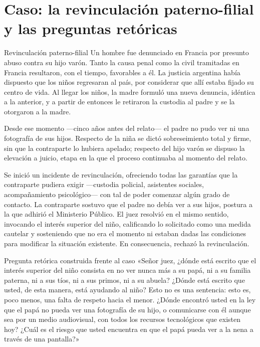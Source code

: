 \documentclass[12pt,oneside]{book}
\begin{document}
\section{Caso: la revinculación paterno-filial y las preguntas retóricas}

\begin{example}{Revinculación paterno-filial}
Un hombre fue denunciado en Francia por presunto abuso contra su hijo varón. Tanto la causa penal como la civil tramitadas en Francia resultaron, con el tiempo, favorables a él. La justicia argentina había dispuesto que los niños regresaran al país, por considerar que allí estaba fijado su centro de vida. Al llegar los niños, la madre formuló una nueva denuncia, idéntica a la anterior, y a partir de entonces le retiraron la custodia al padre y se la otorgaron a la madre.

Desde ese momento —cinco años antes del relato— el padre no pudo ver ni una fotografía de sus hijos. Respecto de la niña se dictó sobreseimiento total y firme, sin que la contraparte lo hubiera apelado; respecto del hijo varón se dispuso la elevación a juicio, etapa en la que el proceso continuaba al momento del relato.
\end{example}

Se inició un incidente de revinculación, ofreciendo todas las garantías que la contraparte pudiera exigir —custodia policial, asistentes sociales, acompañamiento psicológico— con tal de poder comenzar algún grado de contacto. La contraparte sostuvo que el padre no debía ver a sus hijos, postura a la que adhirió el Ministerio Público. El juez resolvió en el mismo sentido, invocando el interés superior del niño, calificando lo solicitado como una medida cautelar y sosteniendo que no era el momento ni estaban dadas las condiciones para modificar la situación existente. En consecuencia, rechazó la revinculación.

\begin{example}{Pregunta retórica construida frente al caso}
«Señor juez, ¿dónde está escrito que el interés superior del niño consista en no ver nunca más a su papá, ni a su familia paterna, ni a sus tíos, ni a sus primos, ni a su abuela? ¿Dónde está escrito que usted, de esta manera, está ayudando al niño? Esto no es una sentencia: esto es, poco menos, una falta de respeto hacia el menor. ¿Dónde encontró usted en la ley que el papá no pueda ver una fotografía de su hijo, o comunicarse con él aunque sea por un medio audiovisual, con todos los recursos tecnológicos que existen hoy? ¿Cuál es el riesgo que usted encuentra en que el papá pueda ver a la nena a través de una pantalla?»
\end{example}
\end{document}
